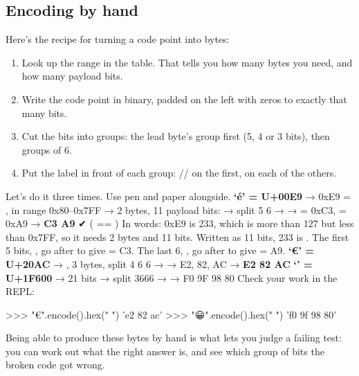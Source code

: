 \documentclass[10pt,a4paper]{article}
\begin{document}
\subsection{Encoding by hand}
Here’s the recipe for turning a code point into bytes:
\begin{enumerate}
\item Look up the range in the table. That tells you how many bytes you need, and how many payload bits.
\item Write the code point in binary, padded on the left with zeros to exactly that many bits.
\item Cut the bits into groups: the lead byte’s group first (5, 4 or 3 bits), then groups of 6.
\item Put the label in front of each group: // on the first,  on each of the others.
\end{enumerate}
Let’s do it three times. Use pen and paper alongside.
\textbf{‘é’ = U+00E9} → 0xE9 = , in range 0x80–0x7FF → 2 bytes, 11 payload bits:  → split 5 \textbar{} 6 →  \textbar{}  →  = 0xC3,  = 0xA9 → \textbf{C3 A9} ✔ ( == )
In words: 0xE9 is 233, which is more than 127 but less than 0x7FF, so it needs 2 bytes and 11 bits. Written as 11 bits, 233 is . The first 5 bits, , go after  to give  = C3. The last 6, , go after  to give  = A9.
\textbf{‘€’ = U+20AC} → , 3 bytes, split 4 \textbar{} 6 \textbar{} 6 →  \textbar{}  \textbar{}  →  E2,  82,  AC → \textbf{E2 82 AC}
\textbf{‘\smiley{}’ = U+1F600} → 21 bits  → split 3\textbar{}6\textbar{}6\textbar{}6 →     → F0 9F 98 80
Check your work in the REPL:
\begin{txtcode}
>>> "€".encode().hex(" ")
'e2 82 ac'
>>> "😀".encode().hex(" ")
'f0 9f 98 80'
\end{txtcode}
Being able to produce these bytes by hand is what lets you judge a failing test: you can work out what the right answer is, and see which group of bits the broken code got wrong.
\end{document}
